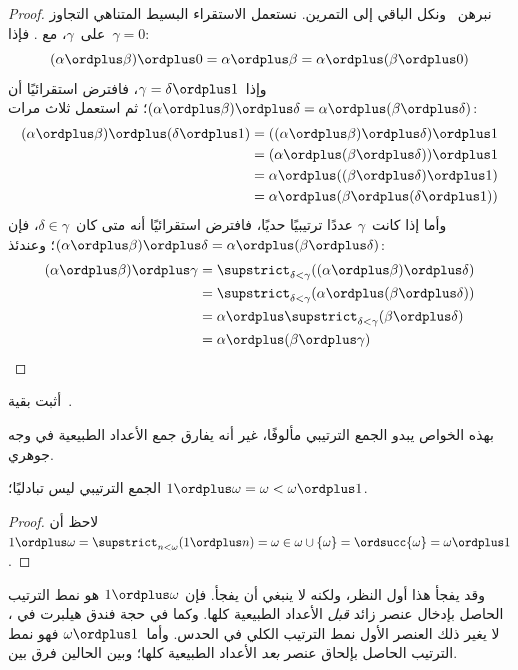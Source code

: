 \documentclass[../../../include/open-logic-section]{subfiles}
\begin{document}
\begin{proof}
نبرهن~ ونكل الباقي إلى التمرين. نستعمل الاستقراء
البسيط المتناهي التجاوز على~$\gamma$، مع
. فإذا~$\gamma = 0$:
\[
(\alpha \ordplus  \beta) \ordplus  0 = \alpha \ordplus  \beta  = \alpha \ordplus  (\beta \ordplus  0)
\]
وإذا~$\gamma = \delta\ordplus 1$، فافترض استقرائيًا أن
$(\alpha \ordplus  \beta) \ordplus  \delta =
\alpha \ordplus  (\beta \ordplus \delta)$؛ ثم استعمل
 ثلاث مرات:
\begin{align*}
	(\alpha \ordplus  \beta) \ordplus  (\delta \ordplus  1) & = ((\alpha \ordplus  \beta) \ordplus  \delta)\ordplus 1\\
	& = (\alpha \ordplus  (\beta \ordplus  \delta)) \ordplus  1\\
	& = \alpha \ordplus  ((\beta \ordplus  \delta)\ordplus 1)\\
	& = \alpha \ordplus  (\beta \ordplus  (\delta\ordplus 1))
\end{align*}	
وأما إذا كانت~$\gamma$ عددًا ترتيبيًا حديًا، فافترض استقرائيًا أنه
متى كان~$\delta \in \gamma$، فإن
$(\alpha \ordplus  \beta) \ordplus  \delta =
\alpha \ordplus  (\beta \ordplus  \delta)$؛ وعندئذ:
\begin{align*}
	(\alpha \ordplus  \beta) \ordplus  \gamma & = \supstrict_{\delta < \gamma}((\alpha \ordplus  \beta) \ordplus  \delta) \\
	&= \supstrict_{\delta < \gamma}(\alpha \ordplus  (\beta \ordplus  \delta))\\
	&= \alpha \ordplus  \supstrict_{\delta < \gamma}(\beta \ordplus  \delta)\\
	& = \alpha \ordplus  (\beta \ordplus  \gamma)
\end{align*}
\end{proof}

\begin{prob}
أثبت بقية~.
\end{prob}

بهذه الخواص يبدو الجمع الترتيبي مألوفًا، غير أنه يفارق جمع الأعداد
الطبيعية في وجه جوهري.

\begin{prop}
الجمع الترتيبي {ليس} تبادليًا؛
$1 \ordplus \omega = \omega < \omega \ordplus 1$.
\end{prop}

\begin{proof}
لاحظ أن~$1 \ordplus \omega = \supstrict_{n < \omega} (1 \ordplus n)
= \omega \in \omega \cup \{\omega\} = \ordsucc{\omega} = \omega
\ordplus 1$.
\end{proof}
\noindent
وقد يفجأ هذا أول النظر، ولكنه لا ينبغي أن يفجأ. فإن
$1 \ordplus \omega$ هو نمط الترتيب الحاصل بإدخال عنصر زائد
\emph{قبل} الأعداد الطبيعية كلها. وكما في حجة فندق هيلبرت في
، لا يغير ذلك العنصر الأول نمط
الترتيب الكلي في الحدس. وأما~$\omega \ordplus 1$ فهو نمط الترتيب
الحاصل بإلحاق عنصر \emph{بعد} الأعداد الطبيعية كلها؛ وبين الحالين
فرق بين.
\end{document}
